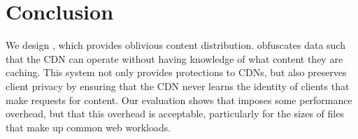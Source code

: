 \section{Conclusion}
\label{sec:conclusion}

We design \system{}, which provides oblivious content
distribution.  \system{} obfuscates data such that the CDN can operate without
having knowledge of what content they are caching.  This system not only
provides protections to CDNs, but also preserves client privacy by ensuring
that the CDN never learns the identity of clients that
make requests for content. %
Our evaluation shows that \system{} imposes some performance
overhead, %
but that this overhead is acceptable, particularly for the sizes of files
that make up common web workloads.
